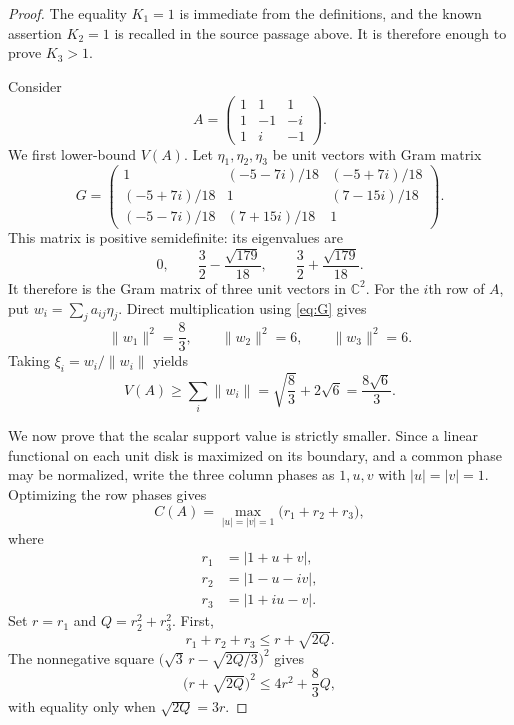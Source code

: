 \documentclass[11pt]{article}
\newcommand{\C}{\mathbb C}
\begin{document}
\begin{proof}
The equality $K_1=1$ is immediate from the definitions, and the known
assertion $K_2=1$ is recalled in the source passage above.  It is therefore
enough to prove $K_3>1$.

Consider
\begin{equation}\label{eq:A}
A=\begin{pmatrix}
1&1&1\\
1&-1&-i\\
1&i&-1
\end{pmatrix}.
\end{equation}
We first lower-bound $V(A)$.  Let $\eta_1,\eta_2,\eta_3$ be unit vectors
with Gram matrix
\begin{equation}\label{eq:G}
G=\begin{pmatrix}
1&(-5-7i)/18&(-5+7i)/18\\
(-5+7i)/18&1&(7-15i)/18\\
(-5-7i)/18&(7+15i)/18&1
\end{pmatrix}.
\end{equation}
This matrix is positive semidefinite: its eigenvalues are
\[
0,\qquad \frac32-\frac{\sqrt{179}}{18},\qquad
\frac32+\frac{\sqrt{179}}{18}.
\]
It therefore is the Gram matrix of three unit vectors in $\C^2$.  For the
$i$th row of $A$, put $w_i=\sum_j a_{ij}\eta_j$.  Direct multiplication
using \eqref{eq:G} gives
\begin{equation}\label{eq:wnorms}
\|w_1\|^2=\frac83,\qquad \|w_2\|^2=6,\qquad \|w_3\|^2=6.
\end{equation}
Taking $\xi_i=w_i/\|w_i\|$ yields
\begin{equation}\label{eq:vectorvalue}
V(A)\geq\sum_i\|w_i\|
=\sqrt{\frac83}+2\sqrt6=\frac{8\sqrt6}{3}.
\end{equation}

We now prove that the scalar support value is strictly smaller.  Since a
linear functional on each unit disk is maximized on its boundary, and a
common phase may be normalized, write the three column phases as $1,u,v$
with $|u|=|v|=1$.  Optimizing the row phases gives
\[
C(A)=\max_{|u|=|v|=1}\bigl(r_1+r_2+r_3\bigr),
\]
where
\begin{align*}
r_1&=|1+u+v|,\\
r_2&=|1-u-iv|,\\
r_3&=|1+iu-v|.
\end{align*}
Set $r=r_1$ and $Q=r_2^2+r_3^2$.  First,
\[
r_1+r_2+r_3\leq r+\sqrt{2Q}.
\]
The nonnegative square
$\bigl(\sqrt3\,r-\sqrt{2Q/3}\bigr)^2$ gives
\begin{equation}\label{eq:weighted}
\bigl(r+\sqrt{2Q}\bigr)^2\leq4r^2+\frac83Q,
\end{equation}
with equality only when $\sqrt{2Q}=3r$.


\end{proof}
\end{document}
